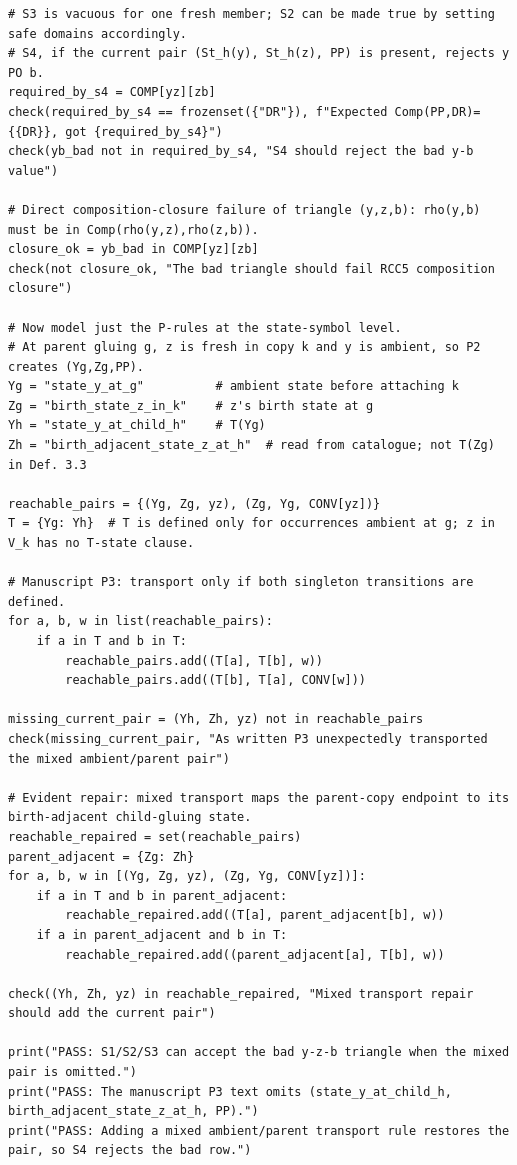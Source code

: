 \documentclass[11pt]{article}
\begin{document}
\begin{lstlisting}[style=reviewpython]
# S3 is vacuous for one fresh member; S2 can be made true by setting safe domains accordingly.
# S4, if the current pair (St_h(y), St_h(z), PP) is present, rejects y PO b.
required_by_s4 = COMP[yz][zb]
check(required_by_s4 == frozenset({"DR"}), f"Expected Comp(PP,DR)={{DR}}, got {required_by_s4}")
check(yb_bad not in required_by_s4, "S4 should reject the bad y-b value")

# Direct composition-closure failure of triangle (y,z,b): rho(y,b) must be in Comp(rho(y,z),rho(z,b)).
closure_ok = yb_bad in COMP[yz][zb]
check(not closure_ok, "The bad triangle should fail RCC5 composition closure")

# Now model just the P-rules at the state-symbol level.
# At parent gluing g, z is fresh in copy k and y is ambient, so P2 creates (Yg,Zg,PP).
Yg = "state_y_at_g"          # ambient state before attaching k
Zg = "birth_state_z_in_k"    # z's birth state at g
Yh = "state_y_at_child_h"    # T(Yg)
Zh = "birth_adjacent_state_z_at_h"  # read from catalogue; not T(Zg) in Def. 3.3

reachable_pairs = {(Yg, Zg, yz), (Zg, Yg, CONV[yz])}
T = {Yg: Yh}  # T is defined only for occurrences ambient at g; z in V_k has no T-state clause.

# Manuscript P3: transport only if both singleton transitions are defined.
for a, b, w in list(reachable_pairs):
    if a in T and b in T:
        reachable_pairs.add((T[a], T[b], w))
        reachable_pairs.add((T[b], T[a], CONV[w]))

missing_current_pair = (Yh, Zh, yz) not in reachable_pairs
check(missing_current_pair, "As written P3 unexpectedly transported the mixed ambient/parent pair")

# Evident repair: mixed transport maps the parent-copy endpoint to its birth-adjacent child-gluing state.
reachable_repaired = set(reachable_pairs)
parent_adjacent = {Zg: Zh}
for a, b, w in [(Yg, Zg, yz), (Zg, Yg, CONV[yz])]:
    if a in T and b in parent_adjacent:
        reachable_repaired.add((T[a], parent_adjacent[b], w))
    if a in parent_adjacent and b in T:
        reachable_repaired.add((parent_adjacent[a], T[b], w))

check((Yh, Zh, yz) in reachable_repaired, "Mixed transport repair should add the current pair")

print("PASS: S1/S2/S3 can accept the bad y-z-b triangle when the mixed pair is omitted.")
print("PASS: The manuscript P3 text omits (state_y_at_child_h, birth_adjacent_state_z_at_h, PP).")
print("PASS: Adding a mixed ambient/parent transport rule restores the pair, so S4 rejects the bad row.")
\end{lstlisting}
\end{document}
